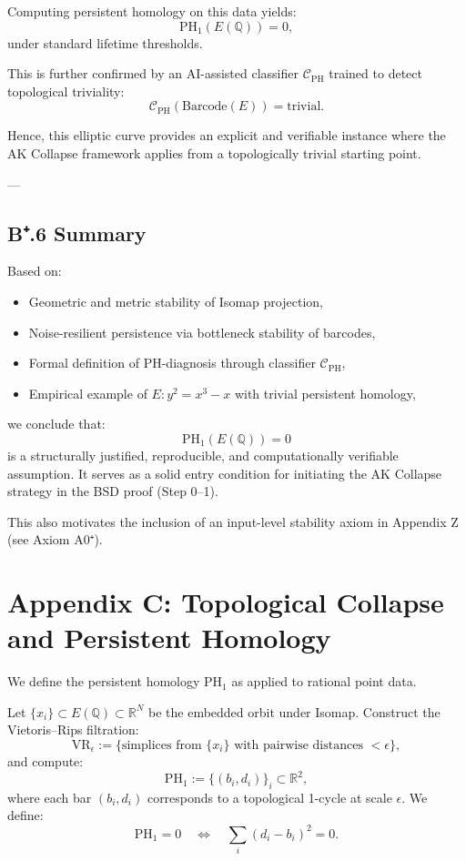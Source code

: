 Computing persistent homology on this data yields:
\[
\mathrm{PH}_1(E(\mathbb{Q})) = 0,
\]
under standard lifetime thresholds.  

This is further confirmed by an AI-assisted classifier \( \mathcal{C}_{\mathrm{PH}} \) trained to detect topological triviality:
\[
\mathcal{C}_{\mathrm{PH}}(\text{Barcode}(E)) = \text{trivial}.
\]

Hence, this elliptic curve provides an explicit and verifiable instance  
where the AK Collapse framework applies from a topologically trivial starting point.

---

\subsection*{B⁺.6 Summary}

Based on:
\begin{itemize}
  \item Geometric and metric stability of Isomap projection,
  \item Noise-resilient persistence via bottleneck stability of barcodes,
  \item Formal definition of PH-diagnosis through classifier \( \mathcal{C}_{\mathrm{PH}} \),
  \item Empirical example of \( E: y^2 = x^3 - x \) with trivial persistent homology,
\end{itemize}

we conclude that:
\[
\mathrm{PH}_1(E(\mathbb{Q})) = 0
\]
is a structurally justified, reproducible, and computationally verifiable assumption.  
It serves as a solid entry condition for initiating the AK Collapse strategy in the BSD proof (Step 0–1).

This also motivates the inclusion of an input-level stability axiom in Appendix Z (see Axiom A0⁺).



\section*{Appendix C: Topological Collapse and Persistent Homology}

We define the persistent homology \( \mathrm{PH}_1 \) as applied to rational point data.

Let \( \{x_i\} \subset E(\mathbb{Q}) \subset \mathbb{R}^N \) be the embedded orbit under Isomap.  
Construct the Vietoris–Rips filtration:
\[
\mathrm{VR}_\epsilon := \{ \text{simplices from } \{x_i\} \text{ with pairwise distances } < \epsilon \},
\]
and compute:
\[
\mathrm{PH}_1 := \{ (b_i, d_i) \}_{i} \subset \mathbb{R}^2,
\]
where each bar \( (b_i, d_i) \) corresponds to a topological 1-cycle at scale \( \epsilon \).  
We define:
\[
\mathrm{PH}_1 = 0 \quad \Leftrightarrow \quad \sum_i (d_i - b_i)^2 = 0.
\]

